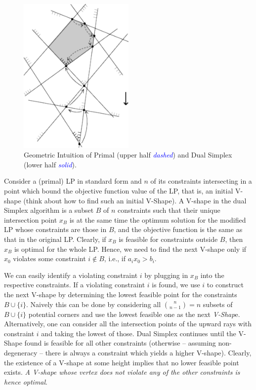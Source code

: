 \documentclass{article}
\begin{document}
\begin{figure}
\begin{center}
\includegraphics[width=0.5\textwidth]{Figs/PrimalDualSimplex.pdf}
\caption{Geometric Intuition of Primal (upper half \textcolor{blue}{\emph{dashed}}) and Dual Simplex (lower half \textcolor{blue}{\emph{solid}}).}\label{fig:PrimalDualSimplex}
\end{center}
\end{figure}

Consider a (primal) LP in standard form and $n$ of its constraints intersecting in a point which bound the objective function value of the LP, that is, an initial V-shape (think about how to find such an initial V-Shape).
A V-shape in the dual Simplex algorithm is a subset $B$ of $n$ constraints such that their unique intersection point $x_B$ is at the same time the optimum solution for the modified LP whose constraints are those in $B$, and the objective function is the same as that in the original LP. 
Clearly, if $x_B$ is feasible for constraints outside $B$, then $x_B$ is optimal for the whole LP.
Hence, we need to find the next V-shape only if $x_0$ violates some constraint $i \notin B$, i.e., if $a_i x_0 > b_i$.

We can easily identify a violating constraint $i$ by plugging in $x_B$ into the respective constraints. If a violating constraint $i$ is found, we use $i$ to construct the next V-shape by determining the lowest feasible point for the constraints $B\cup \{i\}$. Naively this can be done by considering all ${n\choose n-1} =n$ subsets of $B\cup\{i\}$ potential corners and use the lowest feasible one as the next \emph{V-Shap}e. Alternatively, one can consider all the intersection points of the upward rays with constraint $i$ and taking the lowest of those.
Dual Simplex continues until the V-Shape found is feasible for all other constraints (otherwise -- assuming non-degeneracy -- there is always a constraint which yields a higher V-shape). Clearly, the existence of a V-shape at some height implies that no lower feasible point exists. \emph{A V-shape whose vertex does not violate any of the other constraints is hence optimal}.
\end{document}
